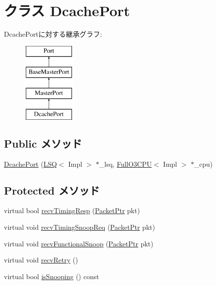 \hypertarget{classFullO3CPU_1_1DcachePort}{
\section{クラス DcachePort}
\label{classFullO3CPU_1_1DcachePort}
}
DcachePortに対する継承グラフ:\begin{figure}[H]
\begin{center}
\leavevmode
\includegraphics[height=4cm]{classFullO3CPU_1_1DcachePort}
\end{center}
\end{figure}
\subsection*{Public メソッド}
\begin{DoxyCompactItemize}
\item 
\hyperlink{classFullO3CPU_1_1DcachePort_a6129287aaec4d06e65661b6225e93a35}{DcachePort} (\hyperlink{classLSQ}{LSQ}$<$ Impl $>$ $\ast$\_\-lsq, \hyperlink{classFullO3CPU}{FullO3CPU}$<$ Impl $>$ $\ast$\_\-cpu)
\end{DoxyCompactItemize}
\subsection*{Protected メソッド}
\begin{DoxyCompactItemize}
\item 
virtual bool \hyperlink{classFullO3CPU_1_1DcachePort_a482dba5588f4bee43e498875a61e5e0b}{recvTimingResp} (\hyperlink{classPacket}{PacketPtr} pkt)
\item 
virtual void \hyperlink{classFullO3CPU_1_1DcachePort_aff3031c56fc4947a19695c868bb8233e}{recvTimingSnoopReq} (\hyperlink{classPacket}{PacketPtr} pkt)
\item 
virtual void \hyperlink{classFullO3CPU_1_1DcachePort_af5b15bc08781cf0ba6190efc37d5b67e}{recvFunctionalSnoop} (\hyperlink{classPacket}{PacketPtr} pkt)
\item 
virtual void \hyperlink{classFullO3CPU_1_1DcachePort_a29cb5a4f98063ce6e9210eacbdb35298}{recvRetry} ()
\item 
virtual bool \hyperlink{classFullO3CPU_1_1DcachePort_a32602a6a3c3d66a639455036d6c08dd6}{isSnooping} () const 
\end{DoxyCompactItemize}
